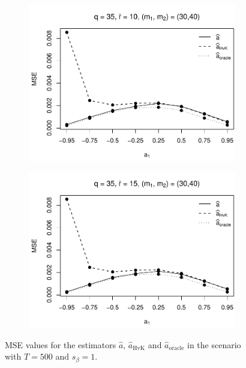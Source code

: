 \begin{figure}[p]
\begin{subfigure}[b]{0.45\textwidth}
\includegraphics[width=\textwidth]{Plots/Robustness/MSE_a1_T=500_slope=1_(q,K1,K2,M1,M2)=(35,2,10,30,40).pdf}
\end{subfigure}
\hspace{0.25cm}
\begin{subfigure}[b]{0.45\textwidth}
\includegraphics[width=\textwidth]{Plots/Robustness/MSE_a1_T=500_slope=1_(q,K1,K2,M1,M2)=(35,2,15,30,40).pdf}
\end{subfigure}
\caption{MSE values for the estimators $\widehat{a}$, $\widehat{a}_{\text{HvK}}$ and $\widehat{a}_{\text{oracle}}$ in the scenario with $T=500$ and $s_\beta=1$.}\label{fig:MSE_slope1_AR_robust} 
\end{figure}


